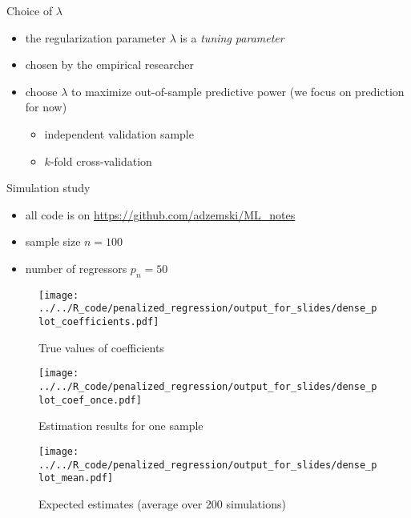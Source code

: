 \documentclass[xcolor=dvipsnames]{beamer}
\begin{document}
\begin{frame}{Choice of $\lambda$}
\begin{itemize}[<+->]
\item the regularization parameter $\lambda$ is a \emph{tuning parameter}
\item chosen by the empirical researcher
\item choose $\lambda$ to maximize out-of-sample predictive power (we focus on prediction for now) 
\begin{itemize}
  \item independent validation sample 
  \item $k$-fold cross-validation
\end{itemize}
\end{itemize}
\end{frame}


\begin{frame}{Simulation study}
\begin{itemize}
  \item all code is on \url{https://github.com/adzemski/ML_notes}
  \item sample size $n = 100$
  \item number of regressors $p_n = 50$
\end{itemize}
\end{frame}


\begin{frame}
\begin{figure}
  \texttt{[image: ../../R\_code/penalized\_regression/output\_for\_slides/dense\_plot\_coefficients.pdf]}
   \caption{True values of coefficients}
\end{figure}
\end{frame}

\begin{frame}
\begin{figure}
  \texttt{[image: ../../R\_code/penalized\_regression/output\_for\_slides/dense\_plot\_coef\_once.pdf]}
   \caption{Estimation results for one sample}
\end{figure}
\end{frame}

\begin{frame}
\begin{figure}
  \texttt{[image: ../../R\_code/penalized\_regression/output\_for\_slides/dense\_plot\_mean.pdf]}
   \caption{Expected estimates (average over 200 simulations)}
\end{figure}
\end{frame}
\end{document}
